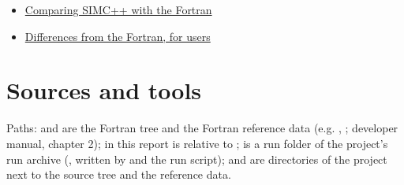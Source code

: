 \begin{itemize}
\item \hyperref[translation_report-useru5fcomparingu5fwithu5ffortran]{Comparing SIMC++ with the Fortran}
\item \hyperref[translation_report-useru5fdifferences]{Differences from the Fortran, for users}
\end{itemize}
\section*{\texorpdfstring{Sources and tools}{Sources and tools}}\label{translation_report-index:sources-and-tools}
Paths:  and  are the Fortran tree and the Fortran reference data (e.g.
, ; developer manual, chapter 2);  in this report is relative to
;  is a run folder of the project's run archive (,
written by  and the run script);  and  are directories of the
project next to the source tree and the reference data.

